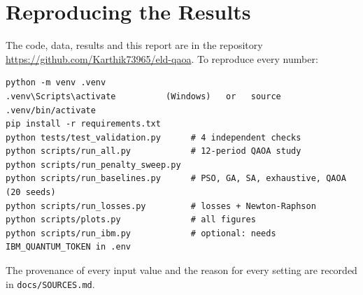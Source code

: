 \chapter{Reproducing the Results}

The code, data, results and this report are in the repository \url{https://github.com/Karthik73965/eld-qaoa}. To reproduce every number:
\begin{lstlisting}
python -m venv .venv
.venv\Scripts\activate          (Windows)   or   source .venv/bin/activate
pip install -r requirements.txt
python tests/test_validation.py      # 4 independent checks
python scripts/run_all.py            # 12-period QAOA study
python scripts/run_penalty_sweep.py
python scripts/run_baselines.py      # PSO, GA, SA, exhaustive, QAOA (20 seeds)
python scripts/run_losses.py         # losses + Newton-Raphson
python scripts/plots.py              # all figures
python scripts/run_ibm.py            # optional: needs IBM_QUANTUM_TOKEN in .env
\end{lstlisting}
The provenance of every input value and the reason for every setting are recorded in \texttt{docs/SOURCES.md}.
